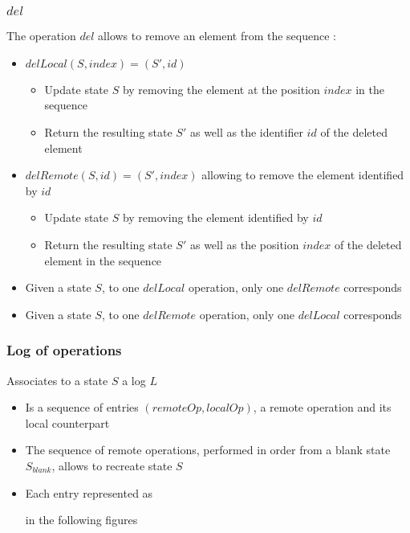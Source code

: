 \documentclass[a4paper]{article}
\begin{document}
\subsubsection{$del$}

The operation $del$ allows to remove an element from the sequence :
\begin{itemize}
  \item $delLocal(S, index) = (S', id)$
  \begin{itemize}
    \item Update state $S$ by removing the element at the position $index$ in the sequence
    \item Return the resulting state $S'$ as well as the identifier $id$ of the deleted element
  \end{itemize}
  \item $delRemote(S, id) = (S', index)$ allowing to remove the element identified by $id$
  \begin{itemize}
    \item Update state $S$ by removing the element identified by $id$
    \item Return the resulting state $S'$ as well as the position $index$ of the deleted element in the sequence
  \end{itemize}
  \item Given a state $S$, to one $delLocal$ operation, only one $delRemote$ corresponds
  \item Given a state $S$, to one $delRemote$ operation, only one $delLocal$ corresponds
\end{itemize}

\subsubsection{Log of operations}

Associates to a state $S$ a log $L$
\begin{itemize}
  \item Is a sequence of entries $(remoteOp, localOp)$, a remote operation and its local counterpart
  \item The sequence of remote operations,
    performed in order from a blank state $S_{blank}$,
    allows to recreate state $S$
  \item Each entry represented as
     in the following figures
\end{itemize}
\end{document}

